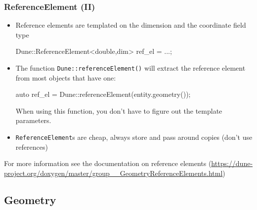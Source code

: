 \documentclass[aspectratio=169,11pt]{beamer}
\theoremstyle{definition}
\begin{document}
\begin{frame}[fragile]
  \frametitle{ReferenceElement (II)}
    \begin{itemize}
    \item Reference elements are templated on the dimension and the coordinate field type
\begin{cppcode}
Dune::ReferenceElement<double,dim> ref_el = ...;
\end{cppcode}
\item The function \lstinline!Dune::referenceElement()! will extract the reference element from most objects
  that have one:
\begin{cppcode}
auto ref_el = Dune::referenceElement(entity.geometry());
\end{cppcode}
    When using this function, you don't have to figure out the template parameters.
    \item \lstinline!ReferenceElement!s are cheap, always store and pass around copies (don't use references)
    \end{itemize}
    For more information see the documentation on reference elements
    (\url{https://dune-project.org/doxygen/master/group__GeometryReferenceElements.html})
\end{frame}




\subsection{Geometry}
\end{document}
